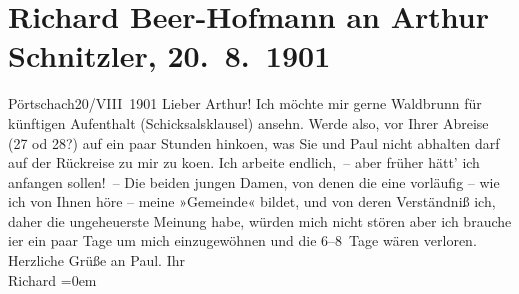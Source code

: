 

         
         \renewcommand{\erwaehntePersonen}{Personen: Paul Goldmann, Olga Schnitzler, Elisabeth Steinrück}
         \renewcommand{\erwaehnteOrte}{Orte: Pörtschach, Welsberg-Taisten, Wildbad Waldbrunn}
         \renewcommand{\erwaehnteWerke}{}
               \section[Richard Beer-Hofmann an Arthur Schnitzler, 20. 8. 1901]{ Richard Beer-Hofmann an Arthur Schnitzler,
               20. 8. 1901}\nopagebreak{}\rehead{ }\begin{ledgroupsized}[t]{13cm}\normalsize\beginnumbering \toendnotes[C]{\smallbreak\pagebreak[2]} 
\toendnotes[C]{\smallbreak}\pstart
           \raggedleft{}{\pb}Pörtschach20/VIII 1901\pend
           \pstart
           Lieber Arthur! Ich möchte mir gerne Waldbrunn für künftigen Aufenthalt (Schicksalsklausel) ansehn. Werde also,
               vor Ihrer Abreise (27 od 28?) auf ein paar Stunden hinko{\geminationm}en, was Sie und Paul nicht abhalten darf auf der Rückreise zu mir zu ko{\geminationm}en. Ich arbeite endlich, – aber früher hätt’ ich
               anfangen sollen! –\pend
           \pstart
           {\pb}Die beiden jungen Damen, von denen die eine vorläufig – wie ich von
               Ihnen höre – meine »Gemeinde« bildet, und von deren Verständniß ich, daher die
               ungeheuerste Meinung habe, würden mich nicht stören aber ich brauche i{\geminationm}er ein paar Tage um mich einzugewöhnen und die 6–8 Tage
               wären verloren.\pend
           \pstart
           Herzliche Grüße an Paul.\pend
           \pstart
           Ihr{\\[\baselineskip]}\spacefill\mbox{Richard}\pend
           \leftskip=0em{}
         
         \endnumbering{}\end{ledgroupsized}  \newcommand{\dateiname}{L01164}\newcommand{\titel}{Richard Beer-Hofmann an Arthur Schnitzler, 20. 8. 1901}\newcommand{\editorInnen}{Martin Anton Müller und Gerd-Hermann Susen}
      